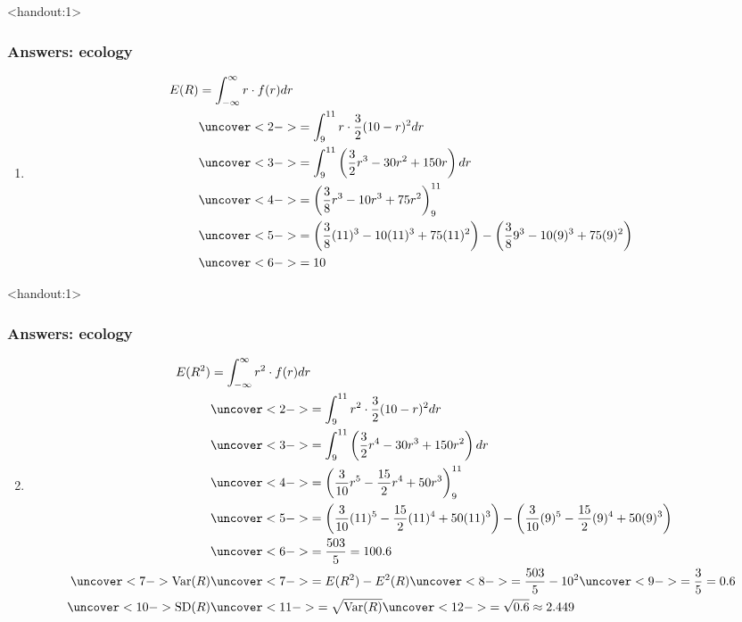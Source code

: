 \documentclass[handout]{beamer}\usepackage{graphicx, color}
\newcommand{\answers}{1}
\numberwithin{equation}{section}
\begin{document}
\begin{frame}<handout:\answers>
\frametitle{Answers: ecology} \scriptsize
\begin{enumerate}[1. ]
\item 
\begin{align*}
E(R) &= \int_{-\infty}^\infty r \cdot f(r) dr \\
&\uncover<2->{= \int_9^{11} r \cdot \frac{3}{2} (10 - r)^2 dr} \\
&\uncover<3->{= \int_{9}^{11} \left (\frac{3}{2} r^3 - 30 r^2+ 150 r \right ) dr} \\
&\uncover<4->{= \left (\frac{3}{8} r^3 - 10 r^3 + 75 r^2 \right )_9^{11}} \\
&\uncover<5->{= \left (\frac{3}{8} (11)^3 - 10 (11)^3 + 75 (11)^2 \right ) - \left (\frac{3}{8} 9^3 - 10 (9) ^3 + 75 (9)^2 \right)} \\
&\uncover<6->{= 10}
\end{align*}
\end{enumerate}
\end{frame}

\begin{frame}<handout:\answers>
\frametitle{Answers: ecology} \scriptsize
\begin{enumerate}[1. ]
\setcounter{enumi}{1}
\item 
\begin{align*}
E(R^2) &= \int_{-\infty}^\infty r^2 \cdot f(r) dr \\
&\uncover<2->{= \int_9^{11} r^2 \cdot \frac{3}{2} (10 - r)^2 dr }\\
&\uncover<3->{= \int_{9}^{11} \left (\frac{3}{2} r^4 - 30 r^3+ 150 r^2 \right ) dr} \\
&\uncover<4->{= \left (\frac{3}{10} r^5 - \frac{15}{2} r^4 + 50 r^3 \right )_9^{11}} \\
&\uncover<5->{= \left (\frac{3}{10} (11)^5 - \frac{15}{2} (11)^4 + 50 (11)^3 \right ) - \left (\frac{3}{10} (9)^5 - \frac{15}{2} (9)^4 + 50 (9)^3 \right )} \\
&\uncover<6->{= \frac{503}{5}  = 100.6} \\
\uncover<7->{\text{Var}(R)} & \uncover<7->{= E(R^2) - E^2(R)} \uncover<8->{ = \frac{503}{5} - 10^2} \uncover<9->{= \frac{3}{5} = 0.6} \\
\uncover<10->{\text{SD}(R)} & \uncover<11->{= \sqrt{\text{Var}(R)}} \uncover<12->{ = \sqrt{0.6} \approx 2.449}
\end{align*}
\end{enumerate}
\end{frame}
\end{document}
